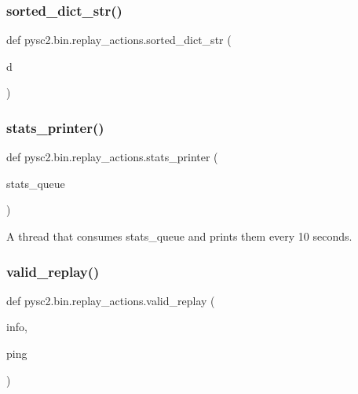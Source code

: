 \subsubsection{\texorpdfstring{sorted\+\_\+dict\+\_\+str()}{sorted\_dict\_str()}}
{\footnotesize\ttfamily def pysc2.\+bin.\+replay\+\_\+actions.\+sorted\+\_\+dict\+\_\+str (\begin{DoxyParamCaption}\item[{}]{d }\end{DoxyParamCaption})}

\mbox{\label{namespacepysc2_1_1bin_1_1replay__actions_a1193b2acf3514b1b6e766a66ba50b8cb}} 
\subsubsection{\texorpdfstring{stats\+\_\+printer()}{stats\_printer()}}
{\footnotesize\ttfamily def pysc2.\+bin.\+replay\+\_\+actions.\+stats\+\_\+printer (\begin{DoxyParamCaption}\item[{}]{stats\+\_\+queue }\end{DoxyParamCaption})}

\begin{DoxyVerb}A thread that consumes stats_queue and prints them every 10 seconds.\end{DoxyVerb}
 \mbox{\label{namespacepysc2_1_1bin_1_1replay__actions_aae5d5407eba33910938aa3a851836a0c}} 
\subsubsection{\texorpdfstring{valid\+\_\+replay()}{valid\_replay()}}
{\footnotesize\ttfamily def pysc2.\+bin.\+replay\+\_\+actions.\+valid\+\_\+replay (\begin{DoxyParamCaption}\item[{}]{info,  }\item[{}]{ping }\end{DoxyParamCaption})}

